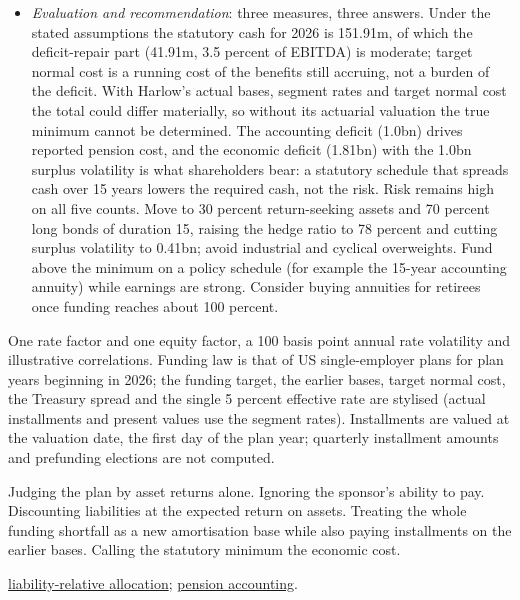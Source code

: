 \begin{qfmethod}
\begin{itemize}
\item \emph{Evaluation and recommendation}: three measures, three answers. Under the stated assumptions the statutory cash for 2026 is 151.91m, of which the deficit-repair part (41.91m, 3.5 percent of EBITDA) is moderate; target normal cost is a running cost of the benefits still accruing, not a burden of the deficit. With Harlow's actual bases, segment rates and target normal cost the total could differ materially, so without its actuarial valuation the true minimum cannot be determined. The accounting deficit (1.0bn) drives reported pension cost, and the economic deficit (1.81bn) with the 1.0bn surplus volatility is what shareholders bear: a statutory schedule that spreads cash over 15 years lowers the required cash, not the risk. Risk remains high on all five counts. Move to 30 percent return-seeking assets and 70 percent long bonds of duration 15, raising the hedge ratio to 78 percent and cutting surplus volatility to 0.41bn; avoid industrial and cyclical overweights. Fund above the minimum on a policy schedule (for example the 15-year accounting annuity) while earnings are strong. Consider buying annuities for retirees once funding reaches about 100 percent.
\end{itemize}

 One rate factor and one equity factor, a 100 basis point annual rate volatility and illustrative correlations. Funding law is that of US single-employer plans for plan years beginning in 2026; the funding target, the earlier bases, target normal cost, the Treasury spread and the single 5 percent effective rate are stylised (actual installments and present values use the segment rates). Installments are valued at the valuation date, the first day of the plan year; quarterly installment amounts and prefunding elections are not computed.

 Judging the plan by asset returns alone. Ignoring the sponsor's ability to pay. Discounting liabilities at the expected return on assets. Treating the whole funding shortfall as a new amortisation base while also paying installments on the earlier bases. Calling the statutory minimum the economic cost.

 \hyperref[meth:liability-relative-allocation]{liability-relative allocation}; \hyperref[meth:post-employment-benefit-reporting]{pension accounting}.

\end{qfmethod}

